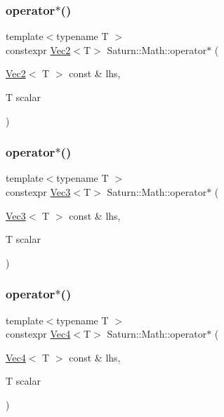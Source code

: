\subsubsection{\texorpdfstring{operator$\ast$()}{operator*()}\hspace{0.1cm}{\footnotesize\ttfamily [2/4]}}
{\footnotesize\ttfamily template$<$typename T $>$ \\
constexpr \mbox{\hyperlink{namespace_saturn_1_1_math_a8befc95aeff660bda92b8807c1cc5224}{Vec2}}$<$T$>$ Saturn\+::\+Math\+::operator$\ast$ (\begin{DoxyParamCaption}\item[{\mbox{\hyperlink{namespace_saturn_1_1_math_a8befc95aeff660bda92b8807c1cc5224}{Vec2}}$<$ T $>$ const \&}]{lhs,  }\item[{T}]{scalar }\end{DoxyParamCaption})}

\mbox{\label{namespace_saturn_1_1_math_a23956694345c4db5ec1150a7ff108440}} 
\subsubsection{\texorpdfstring{operator$\ast$()}{operator*()}\hspace{0.1cm}{\footnotesize\ttfamily [3/4]}}
{\footnotesize\ttfamily template$<$typename T $>$ \\
constexpr \mbox{\hyperlink{namespace_saturn_1_1_math_af4a7a893730c64ac02b620f648cc5406}{Vec3}}$<$T$>$ Saturn\+::\+Math\+::operator$\ast$ (\begin{DoxyParamCaption}\item[{\mbox{\hyperlink{namespace_saturn_1_1_math_af4a7a893730c64ac02b620f648cc5406}{Vec3}}$<$ T $>$ const \&}]{lhs,  }\item[{T}]{scalar }\end{DoxyParamCaption})}

\mbox{\label{namespace_saturn_1_1_math_a046fc8386350eb6d515e4d6f30f17d67}} 
\subsubsection{\texorpdfstring{operator$\ast$()}{operator*()}\hspace{0.1cm}{\footnotesize\ttfamily [4/4]}}
{\footnotesize\ttfamily template$<$typename T $>$ \\
constexpr \mbox{\hyperlink{namespace_saturn_1_1_math_a311b3d690ef397050af7963caa08d1bd}{Vec4}}$<$T$>$ Saturn\+::\+Math\+::operator$\ast$ (\begin{DoxyParamCaption}\item[{\mbox{\hyperlink{namespace_saturn_1_1_math_a311b3d690ef397050af7963caa08d1bd}{Vec4}}$<$ T $>$ const \&}]{lhs,  }\item[{T}]{scalar }\end{DoxyParamCaption})}

